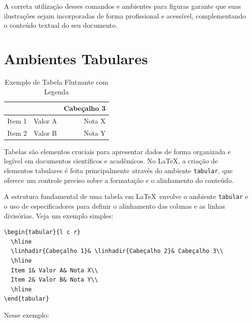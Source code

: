 A correta utilização desses comandos e ambientes para figuras garante que suas ilustrações sejam incorporadas de forma profissional e acessível, complementando o conteúdo textual do seu documento.





\section{Ambientes Tabulares}

\begin{table}[h!]
	\centering
	\caption{Exemplo de Tabela Flutuante com Legenda}\label{tab:exemplo}
	\begin{tabular}{l c r}
		\hline
		\linhadir{Cabeçalho 1} & \linhadir{Cabeçalho 2} & Cabeçalho 3 \\
		\hline
		Item 1 & Valor A & Nota X \\
		Item 2 & Valor B & Nota Y \\
		\hline
	\end{tabular}
	
	\vspace{.3cm}
\end{table}

Tabelas são elementos cruciais para apresentar dados de forma organizada e legível em documentos científicos e acadêmicos. No \LaTeX, a criação de elementos tabulares é feita principalmente através do ambiente \texttt{tabular}, que oferece um controle preciso sobre a formatação e o alinhamento do conteúdo.

A estrutura fundamental de uma tabela em \LaTeX\  envolve o ambiente \texttt{tabular} e o uso de especificadores para definir o alinhamento das colunas e as linhas divisórias. Veja um exemplo simples:

\begin{lstlisting}[language={[LaTeX]TeX}]
\begin{tabular}{l c r}
  \hline
  \linhadir{Cabeçalho 1}& \linhadir{Cabeçalho 2}& Cabeçalho 3\\
  \hline
  Item 1& Valor A& Nota X\\
  Item 2& Valor B& Nota Y\\
  \hline
\end{tabular}
\end{lstlisting}
Nesse exemplo:

